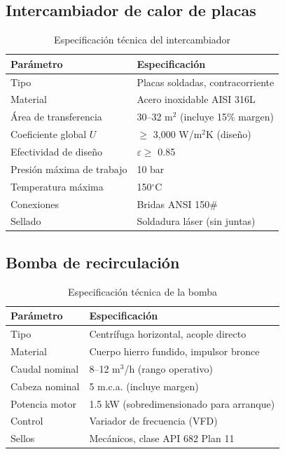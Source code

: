 \documentclass[11pt,a4paper]{article}
\begin{document}
\subsection{Intercambiador de calor de placas}

\begin{table}[H]
\centering
\caption{Especificación técnica del intercambiador}
\begin{tabular}{@{}ll@{}}
\toprule
\textbf{Parámetro} & \textbf{Especificación} \\
\midrule
Tipo & Placas soldadas, contracorriente \\
Material & Acero inoxidable AISI 316L \\
Área de transferencia & 30--32 m$^2$ (incluye 15\% margen) \\
Coeficiente global $U$ & $\geq$ 3,000 W/m$^2$K (diseño) \\
Efectividad de diseño & $\varepsilon \geq$ 0.85 \\
Presión máxima de trabajo & 10 bar \\
Temperatura máxima & 150$^\circ$C \\
Conexiones & Bridas ANSI 150# \\
Sellado & Soldadura láser (sin juntas) \\
\bottomrule
\end{tabular}
\end{table}

\subsection{Bomba de recirculación}

\begin{table}[H]
\centering
\caption{Especificación técnica de la bomba}
\begin{tabular}{@{}ll@{}}
\toprule
\textbf{Parámetro} & \textbf{Especificación} \\
\midrule
Tipo & Centrífuga horizontal, acople directo \\
Material & Cuerpo hierro fundido, impulsor bronce \\
Caudal nominal & 8--12 m$^3$/h (rango operativo) \\
Cabeza nominal & 5 m.c.a. (incluye margen) \\
Potencia motor & 1.5 kW (sobredimensionado para arranque) \\
Control & Variador de frecuencia (VFD) \\
Sellos & Mecánicos, clase API 682 Plan 11 \\
\bottomrule
\end{tabular}
\end{table}
\end{document}
